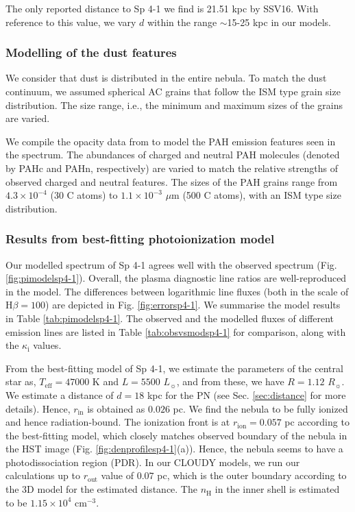 \documentclass[a4paper,fleqn,usenatbib]{mnras}
\begin{document}
The only reported distance to Sp 4-1 we find is 21.51 kpc by SSV16. With reference to this value, we vary $d$ within the range $\sim$15-25 kpc in our models.           

\subsubsection{Modelling of the dust features}
We consider that dust is distributed in the entire nebula. To match the dust continuum, we assumed spherical AC grains that follow the ISM type grain size distribution. The size range, i.e., the minimum and maximum sizes of the grains are varied. 

We compile the opacity data from \citet{2007ApJ...657..810D} to model the PAH emission features seen in the spectrum. The abundances of charged and neutral PAH molecules (denoted by PAHc and PAHn, respectively) are varied to match the relative strengths of observed charged and neutral features. The sizes of the PAH grains range from $4.3\times10^{-4}$ (30 C atoms) to $1.1\times10^{-3}$ $\mu$m (500 C atoms), with an ISM type size distribution.      

\subsubsection{Results from best-fitting photoionization model} 
Our modelled spectrum of Sp 4-1 agrees well with the observed spectrum (Fig. \ref{fig:pimodelsp4-1}). Overall, the plasma diagnostic line ratios are well-reproduced in the model. The differences between logarithmic line fluxes (both in the scale of H$\beta=100$) are depicted in Fig. \ref{fig:errorsp4-1}. We summarise the model results in Table \ref{tab:pimodelsp4-1}. The observed and the modelled fluxes of different emission lines are listed in Table \ref{tab:obsvsmodsp4-1} for comparison, along with the $\kappa_\mathrm{i}$ values. 

From the best-fitting model of Sp 4-1, we estimate the parameters of the central star as, $T_\mathrm{eff}=47000$ K and $L=5500$ $L_{\sun}$, and from these, we have $R=1.12$ $R_{\sun}$. We estimate a distance of $d=18$ kpc for the PN (see Sec. \ref{sec:distance} for more details). Hence, $r_\mathrm{in}$ is obtained as $0.026$ pc. We find the nebula to be fully ionized and hence radiation-bound. The ionization front is at $r_\mathrm{ion}=0.057$ pc according to the best-fitting model, which closely matches observed boundary of the nebula in the HST image (Fig. \ref{fig:denprofilesp4-1}(a)). Hence, the nebula seems to have a photodissociation region (PDR). In our CLOUDY models, we run our calculations up to $r_\mathrm{out}$ value of $0.07$ pc, which is the outer boundary according to the 3D model for the estimated distance. The $n_\mathrm{H}$ in the inner shell is estimated to be $1.15\times10^4$ $\mathrm{cm^{-3}}$.
\end{document}

